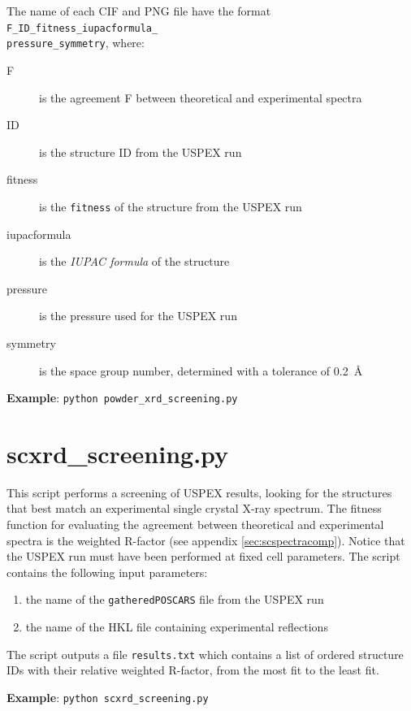 \documentclass{article}
\begin{document}
The name of each CIF and PNG file have the format \texttt{F\_ID\_fitness\_iupacformula\_ \\ pressure\_symmetry}, where:
\begin{description}
	\item[F] is the agreement F between theoretical and experimental spectra
	\item[ID] is the structure ID from the USPEX run
	\item[fitness] is the \texttt{fitness} of the structure from the USPEX run
	\item[iupacformula] is the \emph{IUPAC formula} of the structure
	\item[pressure] is the pressure used for the USPEX run
	\item[symmetry] is the space group number, determined with a tolerance of 0.2~\AA
\end{description}
\textbf{Example}: \texttt{python powder\_xrd\_screening.py}

\section{scxrd\_screening.py}
This script performs a screening of USPEX results, looking for the structures that best match an experimental single crystal X-ray spectrum. The fitness function for evaluating the agreement between theoretical and experimental spectra is the weighted R-factor (see appendix \ref{sec:scspectracomp}). Notice that the USPEX run must have been performed at fixed cell parameters. The script contains the following input parameters:
\begin{enumerate}
	\item the name of the \texttt{gatheredPOSCARS} file from the USPEX run
	\item the name of the HKL file containing experimental reflections
\end{enumerate}
The script outputs a file \texttt{results.txt} which contains a list of ordered structure IDs with their relative weighted R-factor, from the most fit to the least fit.

\noindent \textbf{Example}: \texttt{python scxrd\_screening.py}
\end{document}
